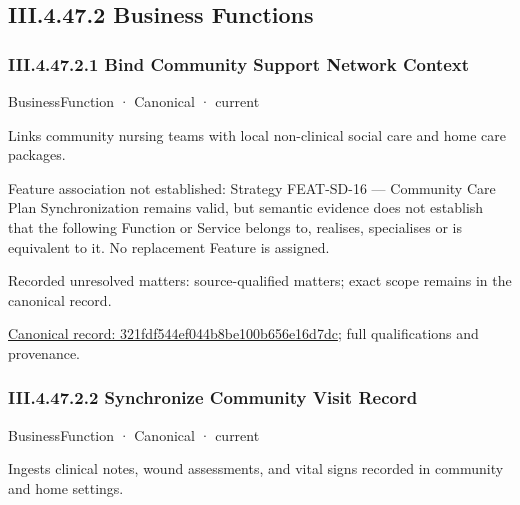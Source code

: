 \subsection*{III.4.47.2 Business Functions}
\label{navigation:III.4.47.2}

\subsubsection*{III.4.47.2.1 Bind Community Support Network Context}
\label{navigation:III.4.47.2.1}

\label{element:321fdf544ef044b8be100b656e16d7dc}
{\small BusinessFunction · Canonical · current}\par

Links community nursing teams with local non-clinical social care and home care packages.



Feature association not established: Strategy FEAT-SD-16 — Community Care Plan Synchronization remains valid, but semantic evidence does not establish that the following Function or Service belongs to, realises, specialises or is equivalent to it. No replacement Feature is assigned.


{\small Recorded unresolved matters: source-qualified matters; exact scope remains in the canonical record.}\par
{\footnotesize \href{../../../../continuum/business/business-function/321fdf544ef044b8be100b656e16d7dc.md}{Canonical record: 321fdf544ef044b8be100b656e16d7dc}; full qualifications and provenance.}\par
\subsubsection*{III.4.47.2.2 Synchronize Community Visit Record}
\label{navigation:III.4.47.2.2}

\label{element:cbd4817eb757449a8f0a0e8ce02c5f07}
{\small BusinessFunction · Canonical · current}\par

Ingests clinical notes, wound assessments, and vital signs recorded in community and home settings.


